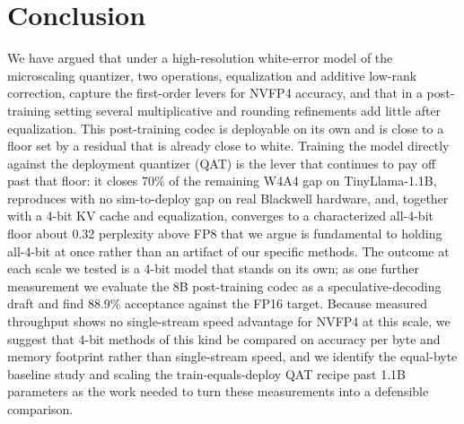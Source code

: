 \documentclass[11pt]{article}
\begin{document}
\section{Conclusion}
We have argued that under a high-resolution white-error model of the microscaling
quantizer, two operations, equalization and additive low-rank correction, capture the
first-order levers for NVFP4 accuracy, and that in a post-training setting several
multiplicative and rounding refinements add little after equalization. This post-training
codec is deployable on its own and is close to a floor set by a residual that is already
close to white. Training the model directly against the deployment quantizer (QAT) is
the lever that continues to pay off past that floor: it closes 70\% of the remaining
W4A4 gap on TinyLlama-1.1B, reproduces with no sim-to-deploy gap on real Blackwell
hardware, and, together with a 4-bit KV cache and equalization, converges to a
characterized all-4-bit floor about 0.32 perplexity above FP8 that we argue is
fundamental to holding all-4-bit at once rather than an artifact of our specific
methods. The outcome at each scale we tested is a 4-bit model that stands on its own; as
one further measurement we evaluate the 8B post-training codec as a speculative-decoding
draft and find 88.9\% acceptance against the FP16 target. Because measured throughput
shows no single-stream speed advantage for NVFP4 at this scale, we suggest that 4-bit
methods of this kind be compared on accuracy per byte and memory footprint rather than
single-stream speed, and we identify the equal-byte baseline study and scaling the
train-equals-deploy QAT recipe past 1.1B parameters as the work needed to turn these
measurements into a defensible comparison.
\end{document}
